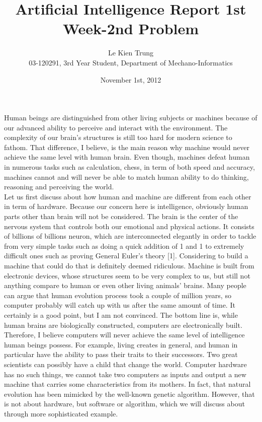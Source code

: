 \documentclass[11pt]{article}
\title{Artificial Intelligence Report 1st Week-2nd Problem}
\author{Le Kien Trung \\
03-120291, 3rd Year Student, Department of Mechano-Informatics }
\date{November 1st, 2012}
\begin{document}
\maketitle

Human beings are distinguished from other living subjects or machines because of our advanced ability to perceive and interact with the environment. The complexity of our brain's structures is still too hard for modern science to fathom. That difference, I believe, is the main reason why machine would never achieve the same level with human brain. Even though, machines defeat human in numerous tasks such as calculation, chess, in term of both speed and accuracy, machines cannot and will never be able to match human ability to do thinking, reasoning and perceiving the world. \\

Let us first discuss about how human and machine are different from each other in term of hardware. Because our concern here is intelligence, obviously human parts other than brain will not be considered. The brain is the center of the nervous system that controls both our emotional and physical actions. It consists of billions of billions neuron, which are interconnected elegantly in order to tackle from very simple tasks such as doing a quick addition of 1 and 1 to extremely difficult ones such as proving General Euler's theory [1]. Considering to build a machine that could do that is definitely deemed ridiculous. Machine is built from electronic devices, whose structures seem to be very complex to us, but still not anything compare to human or even other living animals' brains. Many people can argue that human evolution process took a couple of million years, so computer probably will catch up with us after the same amount of time. It certainly is a good point, but I am not convinced. The bottom line is, while human brains are biologically constructed, computers are electronically built. Therefore, I believe computers will never achieve the same level of intelligence human beings possess. For example, living creates in general, and human in particular have the ability to pass their traits to their successors. Two great scientists can possibly have a child that change the world. Computer hardware has no such things, we cannot take two computers as inputs and output a new machine that carries some characteristics from its mothers. In fact, that natural evolution has been mimicked by the well-known genetic algorithm. However, that is not about hardware, but software or algorithm, which we will discuss about through more sophisticated example.\\
\end{document}
